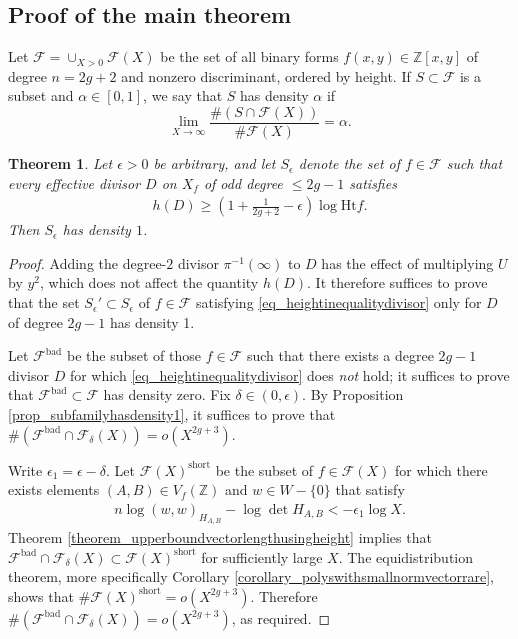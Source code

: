 \documentclass{article} %
\newtheorem{theorem}[proposition]{Theorem}
\numberwithin{equation}{section}
\newcommand{\Z}{\mathbb{Z}}
\newcommand{\height}{\mathrm{Ht}}
\begin{document}
\subsection{Proof of the main theorem}

Let $\mathcal{F} = \cup_{X>0} \mathcal{F}(X)$ be the set of all binary forms $f(x,y)\in \Z[x,y]$ of degree $n=2g+2$ and nonzero discriminant, ordered by height. If $S \subset \mathcal{F}$ is a subset and $\alpha \in [0, 1]$, we say that $S$ has density $\alpha$ if
\[ \lim_{X \to \infty} \frac{ \# (S \cap \mathcal{F}(X)) }{ \# \mathcal{F}(X) } = \alpha. \]
\begin{theorem}\label{theorem_lowerboundheightdivisor}
    Let $\epsilon>0$ be arbitrary, and let $S_\epsilon$ denote the set of $f \in \mathcal{F}$ such that every effective divisor $D$ on $X_f$ of odd degree $\leq 2g-1$ satisfies
    \begin{align}\label{eq_heightinequalitydivisor}
        h(D) \geq \left(1 + \frac{1}{2g+2} -\epsilon \right) \log \height f.
    \end{align}
    Then $S_\epsilon$ has density $1$. 
\end{theorem}
\begin{proof}
    Adding the degree-$2$ divisor $\pi^{-1}(\infty)$ to $D$ has the effect of multiplying $U$ by $y^2$, which does not affect the quantity $h(D)$. 
    It therefore suffices to prove that the set $S_\epsilon' \subset S_\epsilon$ of $f\in \mathcal{F}$ satisfying \eqref{eq_heightinequalitydivisor} only for $D$ of degree $2g-1$ has density 1. 
    
    Let $\mathcal{F}^{\text{bad}}$ be the subset of those $f\in \mathcal{F}$ such that there exists a degree $2g-1$ divisor $D$ for which \eqref{eq_heightinequalitydivisor} does \emph{not} hold; it suffices to prove that $\mathcal{F}^{\text{bad}}\subset \mathcal{F}$ has density zero. Fix $\delta \in (0, \epsilon)$. 
    By Proposition \ref{prop_subfamilyhasdensity1}, it suffices to prove that $\#(\mathcal{F}^{\text{bad}} \cap \mathcal{F}_{\delta}(X)) = o(X^{2g+3})$.

    Write $\epsilon_1 = \epsilon - \delta$.
    Let $\mathcal{F}(X)^{\text{short}}$ be the subset of $f\in \mathcal{F}(X)$ for which there exists elements $(A,B) \in V_f(\Z)$ and $w\in W - \{ 0 \}$ that satisfy 
    \begin{align}\label{eq1_proofmaintheorem}
         n\log (w,w)_{H_{A,B}} - \log \det H_{A,B}< -\epsilon_1 \log X.
    \end{align}
    Theorem \ref{theorem_upperboundvectorlengthusingheight} implies that $\mathcal{F}^{\text{bad}} \cap \mathcal{F}_{\delta}(X)\subset \mathcal{F}(X)^{\text{short}}$ for sufficiently large $X$.
    The equidistribution theorem, more specifically Corollary \ref{corollary_polyswithsmallnormvectorrare}, shows that $\#\mathcal{F}(X)^{\text{short}} = o(X^{2g+3})$.
    Therefore $\#(\mathcal{F}^{\text{bad}} \cap \mathcal{F}_{\delta}(X)) = o(X^{2g+3})$, as required.
\end{proof}
\end{document}

